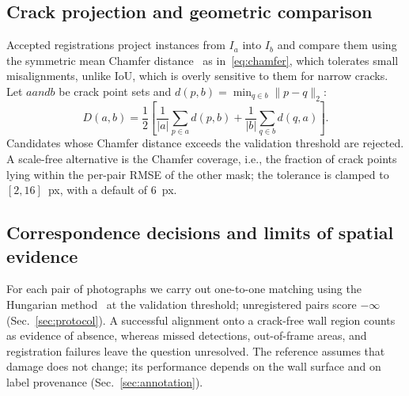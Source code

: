 \subsection{Crack projection and geometric comparison}
\label{sec:chamfer}

Accepted registrations project instances from $I_a$ into $I_b$ and compare them using the symmetric mean Chamfer distance~\cite{barrow1977chamfer} as in~\eqref{eq:chamfer}, which tolerates small misalignments, unlike IoU, which is overly sensitive to them for narrow cracks.
Let $a and b$ be crack point sets and $d(p, b)=\min_{q \in b}\lVert p-q\rVert_2$:
\begin{equation}
D(a,b)=\frac{1}{2}\left[\frac{1}{|a|}\sum_{p \in a} d(p, b)+
\frac{1}{|b|}\sum_{q \in b} d(q, a)\right].
\label{eq:chamfer}
\end{equation}
Candidates whose Chamfer distance exceeds the validation threshold are rejected.
A scale-free alternative is the Chamfer coverage, i.e., the fraction of crack points lying within the per-pair RMSE of the other mask; the tolerance is clamped to $[2,16]$~px, with a default of $6$~px.

\subsection{Correspondence decisions and limits of spatial evidence}

For each pair of photographs we carry out one-to-one matching using the Hungarian method~\cite{kuhn1955hungarian} at the validation threshold; unregistered pairs score $-\infty$ (Sec.~\ref{sec:protocol}).
A successful alignment onto a crack-free wall region counts as evidence of absence, whereas missed detections, out-of-frame areas, and registration failures leave the question unresolved.
The reference assumes that damage does not change; its performance depends on the wall surface and on label provenance (Sec.~\ref{sec:annotation}).
